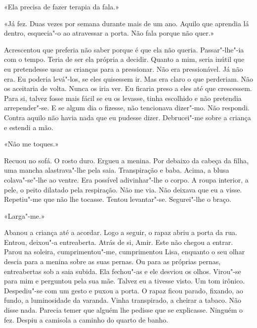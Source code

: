 «Ela precisa de fazer terapia da fala.»

«Já fez. Duas vezes por semana durante mais de um ano. Aquilo que
aprendia lá dentro, esquecia"-o ao atravessar a porta. Não fala porque
não quer.»

Acrescentou que preferia não saber porque é que ela não queria.
Passar"-lhe"-ia com o tempo. Teria de ser ela própria a decidir. Quanto
a mim, seria inútil que eu pretendesse usar as crianças para a
pressionar. Não era pressionável. Já não era. Eu poderia levá"-los, se
eles quisessem ir. Mas era claro o que perderiam. Não os aceitaria de
volta. Nunca os iria ver. Eu ficaria preso a eles até que crescessem.
Para si, talvez fosse mais fácil se eu os levasse, tinha escolhido e não
pretendia arrepender"-se. E se algum dia o fizesse, não tencionava
dizer"-mo. Não respondi. Contra aquilo não havia nada que eu pudesse
dizer. Debrucei"-me sobre a criança e estendi a mão.

«Não me toques.»

Recuou no sofá. O rosto duro. Ergueu a menina. Por debaixo da cabeça da
filha, uma mancha alastrava"-lhe pela saia. Transpiração e baba. Acima,
a blusa colava"-se"-lhe ao ventre. Era possível adivinhar"-lhe o corpo.
A roupa interior, a pele, o peito dilatado pela respiração. Não me via.
Não deixava que eu a visse. Repetiu"-me que não lhe tocasse. Tentou
levantar"-se. Segurei"-lhe o braço.

«Larga"-me.»

Abanou a criança até a acordar. Logo a seguir, o rapaz abriu a porta da
rua. Entrou, deixou"-a entreaberta. Atrás de si, Amir. Este não chegou a
entrar. Parou na soleira, cumprimentou"-me, cumprimentou Lisa, enquanto
o seu olhar descia para a menina sobre as suas pernas. Ou para as
próprias pernas, entreabertas sob a saia subida. Ela fechou"-as e ele
desviou os olhos. Virou"-se para mim e perguntou pela sua mãe. Talvez eu
a tivesse visto. Um tom irônico. Despediu"-se com um gesto e puxou a
porta. O rapaz ficou parado, fixando, ao fundo, a luminosidade da
varanda. Vinha transpirado, a cheirar a tabaco. Não disse nada. Parecia
temer que alguém lhe pedisse que se explicasse. Ninguém o fez. Despiu a
camisola a caminho do quarto de banho.

